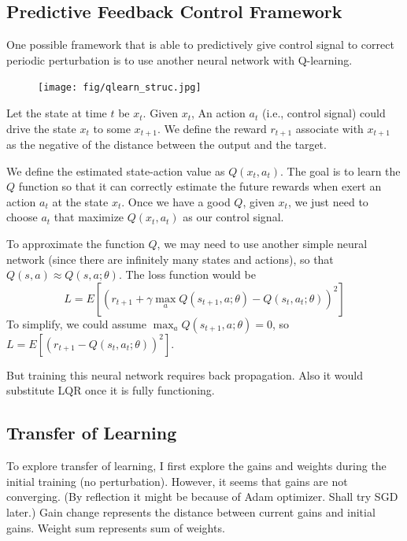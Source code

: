 \documentclass[12pt, a4paper]{article}
\begin{document}
\newpage

\subsection*{Predictive Feedback Control Framework}

One possible framework that is able to predictively give control signal to correct periodic perturbation is to use another neural network with Q-learning.

\begin{figure}[H]
    \centering
    \texttt{[image: fig/qlearn\_struc.jpg]}
    \label{fig:1}
\end{figure}

Let the state at time $t$ be $x_t$. Given $x_t$, An action $a_t$ (i.e., control signal) could drive the state $x_t$ to some $x_{t+1}$. We define the reward $r_{t+1}$ associate with $x_{t+1}$ as the negative of the distance between the output and the target.

We define the estimated state-action value as $Q(x_t, a_t)$. The goal is to learn the $Q$ function so that it can correctly estimate the future rewards when exert an action $a_t$ at the state $x_t$. Once we have a good $Q$, given $x_t$, we just need to choose $a_t$ that maximize $Q(x_t, a_t)$ as our control signal.

To approximate the function $Q$, we may need to use another simple neural network (since there are infinitely many states and actions), so that $Q(s,a) \approx Q(s,a;\theta)$. The loss function would be 
$$ L = E \left[ \left( r_{t+1} + \gamma \max_{a} Q(s_{t+1},a; \theta) - Q(s_t, a_t; \theta) \right)^2 \right] $$
To simplify, we could assume $\max_{a} Q(s_{t+1}, a; \theta) = 0$, so $ L = E \left[ \left( r_{t+1} - Q(s_t, a_t; \theta) \right)^2 \right] $. 

But training this neural network requires back propagation. Also it would substitute LQR once it is fully functioning.

\newpage

\subsection*{Transfer of Learning}

To explore transfer of learning, I first explore the gains and weights during the initial training (no perturbation). However, it seems that gains are not converging. (By reflection it might be because of Adam optimizer. Shall try SGD later.) Gain change represents the distance between current gains and initial gains. Weight sum represents sum of weights.
\end{document}
